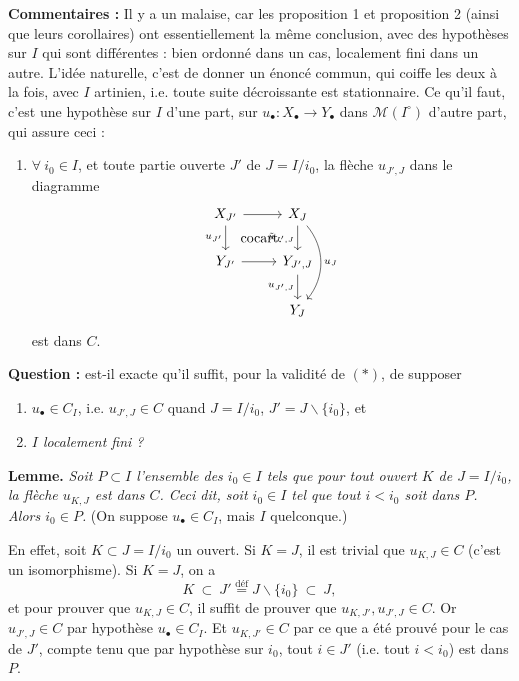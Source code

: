 \documentclass[11pt]{article}
\newcommand{\printedpage}[1]{\marginpar{\footnotesize p.~#1\ifstrequal{#1}{1}{\\[2pt]{[page 1]}}{}}}
\newcommand{\msp}[1]{\ifstrequal{#1}{page 1}{}{\marginpar{\footnotesize [#1]}}}
\newcommand{\cocart}{\textup{cocart.}}
\begin{document}
\textbf{Commentaires :} Il y a un malaise, car les proposition 1 et proposition 2 (ainsi que leurs corollaires) ont essentiellement la même conclusion, avec des hypothèses sur $I$ qui sont \msp{page 23} différentes : bien ordonné dans un cas, localement fini dans un autre. L'idée naturelle, c'est de donner un énoncé commun, qui coiffe les deux à la fois, avec $I$ artinien, i.e. toute suite décroissante est stationnaire. Ce qu'il faut, c'est une hypothèse sur $I$ d'une part, sur $u_\bullet : X_\bullet \longrightarrow Y_\bullet$ dans $\mathcal{M}(I^\circ)$ d'autre part, qui assure ceci :

\begin{enumerate}
\item[$(*)$] $\forall\ i_0 \in I$, et toute partie ouverte $J'$ de $J = I/i_0$, la flèche $u_{J',J}$ dans le diagramme
\[
\begin{tikzcd}
X_{J'} \arrow[r] \arrow[d, "u_{J'}"'] \arrow[dr, phantom, "\cocart"] & X_J \arrow[d, "\tilde{u}_{J',J}"'] \arrow[dd, bend left=40, "u_J"] \\
Y_{J'} \arrow[r] & Y_{J',J} \arrow[d, "u_{J',J}"'] \\
 & Y_J
\end{tikzcd}
\]
est dans $C$.
\end{enumerate}

\textbf{Question :} est-il exacte qu'il suffit, pour la validité de $(*)$, de supposer %
\begin{enumerate}
\item[a)] $u_\bullet \in C_I$, i.e. $u_{J',J} \in C$ quand $J = I/i_0$, $J' = J \backslash \{i_0\}$, et
\item[b)] \textit{$I$ localement fini ?}
\end{enumerate}

\printedpage{14}

\msp{page 24}

\textbf{Lemme.} \textit{Soit $P \subset I$ l'ensemble des $i_0 \in I$ tels que pour tout ouvert $K$ de $J = I/i_0$, la flèche $u_{K,J}$ est dans $C$. Ceci dit, soit $i_0 \in I$ tel que tout $i < i_0$ soit dans $P$. Alors $i_0 \in P$.} (On suppose $u_\bullet \in C_I$, mais $I$ quelconque.)

En effet, soit $K \subset J = I/i_0$ un ouvert. Si $K = J$, il est trivial que $u_{K,J} \in C$ (c'est un isomorphisme). Si $K = J$, on a %
\[
K \ \subset\ J' \overset{\text{déf}}{=} J\backslash\{i_0\} \ \subset\ J,
\]
et pour prouver que $u_{K,J} \in C$, il suffit de prouver que $u_{K,J'}, u_{J',J} \in C$. Or $u_{J',J} \in C$ par hypothèse $u_\bullet \in C_I$. Et $u_{K,J'} \in C$ par ce que a été prouvé pour le cas de $J'$, compte tenu que par hypothèse sur $i_0$, tout $i \in J'$ (i.e. tout $i < i_0$) est dans $P$. %
\end{document}
